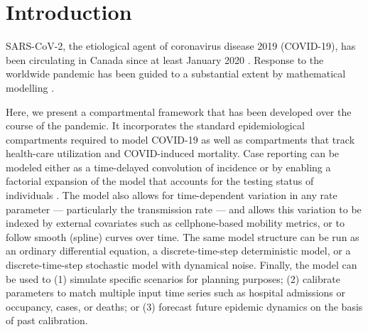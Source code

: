 \documentclass[12pt]{article}\usepackage[]{graphicx}\usepackage[]{color}
\begin{document}

\tableofcontents




\section{Introduction}

SARS-CoV-2, the etiological agent of coronavirus disease 2019 (COVID-19), has been circulating in Canada since at least January 2020 \cite{onpr_200125}.
Response to the worldwide pandemic \cite{Li+20,Fauc+20} has been guided to a substantial extent by mathematical modelling \cite{Flax+20}.


Here, we present a compartmental framework that has been developed over the course of the pandemic. 
It incorporates the standard epidemiological compartments required to model COVID-19 as well as compartments that track health-care utilization and COVID-induced
mortality. 
Case reporting can be modeled either as a time-delayed convolution of incidence or by enabling a factorial expansion of the model that accounts for the testing status of individuals \cite{Fris+20}. 
The model also allows for time-dependent variation in any rate parameter --- particularly the transmission rate --- and allows this variation to be indexed by external covariates such as cellphone-based mobility metrics, or to follow smooth (spline) curves over time. 
The same model structure can be run as an ordinary differential equation, a discrete-time-step deterministic model, or a discrete-time-step stochastic model with dynamical noise.
Finally, the model can be used to
(1) simulate specific scenarios for planning purposes;
(2) calibrate parameters to match multiple input time series such as hospital admissions or occupancy, cases, or deaths; or
(3) forecast future epidemic dynamics on the basis of past calibration.
\end{document}
